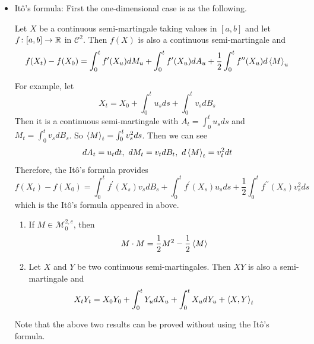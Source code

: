 \documentclass[a4paper,12pt]{article}
\begin{document}
\begin{itemize}
  \item It\^o's formula: First the one-dimensional case is as the following.

  \begin{thm}
    Let $X$ be a continuous semi-martingale taking values in $[a,b]$ and let $f \colon [a,b] \rightarrow \mathbb{R}$ in $\mathcal{C}^2$. Then $f(X)$ is also a continuous semi-martingale and
    \begin{equation*}
      f(X_t) - f(X_0) = \int_0^tf^\prime(X_u)dM_u + \int_0^tf^\prime(X_u)dA_u + \frac{1}{2}\int_0^tf^{\prime\prime}(X_u)d\left\langle M \right\rangle_u
    \end{equation*}
  \end{thm}
  \begin{exam}
    For example, let
    \begin{equation*}
      X_t = X_0 + \int_0^tu_sds + \int_0^tv_sdB_s
    \end{equation*}
    Then it is a continuous semi-martingale with $A_t = \int_0^tu_sds$ and $M_t = \int_0^tv_sdB_s$. So $\left\langle M \right\rangle_t = \int_0^tv_s^2ds$. Then we can see
    \begin{equation*}
      dA_t = u_t dt,~dM_t = v_tdB_t,~d\left\langle M \right\rangle_t = v_t^2dt
    \end{equation*}
    Therefore, the It\^o's formula provides
    \begin{equation*}
      f(X_t) - f(X_0) = \int_0^tf^\prime(X_s)v_sdB_s + \int_0^tf^\prime(X_s)u_sds + \frac{1}{2}\int_0^tf^{\prime\prime}(X_s)v_s^2ds
    \end{equation*}
    which is the It\^o's formula appeared in above.
  \end{exam}
  \begin{prop}
    \begin{enumerate}[label=(\arabic*)]
      \item If $M \in \mathcal{M}_0^{2,c}$, then
      \begin{equation*}
        M \cdot M = \frac{1}{2}M^2 - \frac{1}{2}\left\langle M \right\rangle
      \end{equation*}
      \item Let $X$ and $Y$ be two continuous semi-martingales. Then $XY$ is also a semi-martingale and
      \begin{equation*}
        X_tY_t = X_0Y_0 + \int_0^tY_u dX_u + \int_0^t X_udY_u + \left\langle X,Y \right\rangle_t
      \end{equation*}
    \end{enumerate}
  \end{prop}
  Note that the above two results can be proved without using the It\^o's formula.

\end{itemize}
\end{document}
